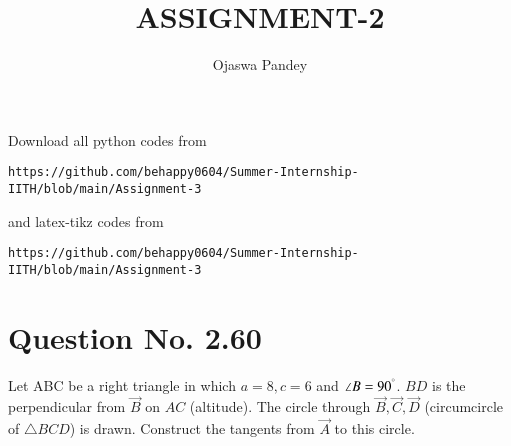 \documentclass[journal,12pt,twocolumn]{IEEEtran}
\begin{document}
     \def\topbox#1{\raisebox{-\baselineskip}[0in][0in]{#1}}
     \def\midbox#1{\raisebox{-0.5\baselineskip}[0in][0in]{#1}}
\vspace{3cm}
\title{ASSIGNMENT-2}
\author{Ojaswa Pandey}
\maketitle
\newpage
\bigskip
\renewcommand{\thefigure}{\theenumi}
\renewcommand{\thetable}{\theenumi}
Download all python codes from 
\begin{lstlisting}
https://github.com/behappy0604/Summer-Internship-IITH/blob/main/Assignment-3
\end{lstlisting}
%
and latex-tikz codes from 
%
\begin{lstlisting}
https://github.com/behappy0604/Summer-Internship-IITH/blob/main/Assignment-3
\end{lstlisting}
%
\section{Question No. 2.60}   
Let ABC be a right triangle in which $a = 8, c = 6$ and $\angle B = 90^{\degree}$.  $BD$ is the 
perpendicular from $\vec{B}$ on $AC$ (altitude). The circle through $\vec{B}, \vec{C}, \vec{D}$ (circumcircle of $\triangle BCD$) is drawn.  Construct the 
tangents from $\vec{A}$ to this circle.
\end{document}
